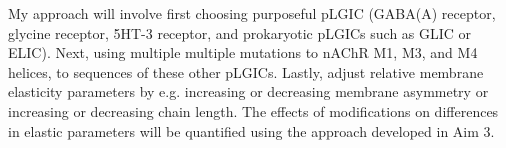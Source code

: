 My approach will involve first choosing purposeful pLGIC (GABA(A) receptor, glycine receptor, 5HT-3 receptor, and prokaryotic pLGICs such as GLIC or ELIC). Next, using multiple  multiple mutations to nAChR M1, M3, and M4 helices, to sequences of these other pLGICs. Lastly, adjust relative membrane elasticity parameters by e.g. increasing or decreasing membrane asymmetry or increasing or decreasing chain length. The effects of modifications on differences in elastic parameters will be quantified using the approach developed in Aim 3.

